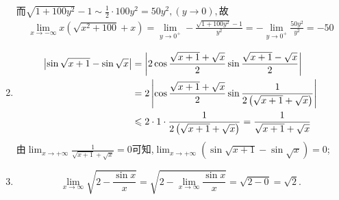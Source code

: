 \begin{solution}
\begin{enumerate}
        而$\sqrt{1+100y^2}-1\sim \frac{1}{2}\cdot 100y^2=50y^2,(y\to 0),$故
        \begin{align*}
            \lim_{x \to -\infty}x(\sqrt{x^2+100}+x) =\lim_{y \to 0^+}-\frac{\sqrt{1+100y^2}-1}{y^2}=-\lim_{y \to 0^+}\frac{50y^2}{y^2}=-50
        \end{align*} 
        \item \begin{align*}
            \left| \sin \sqrt{x+1}-\sin\sqrt{x} \right| &=\left| 2 \cos \frac{\sqrt{x+1}+\sqrt{x}}{2} \sin \frac{\sqrt{x+1}-\sqrt{x}}{2} \right|  \\
            &=2 \left|\cos \frac{\sqrt{x+1}+\sqrt{x}}{2}\sin \frac{1}{2\left(\sqrt{x+1}+\sqrt{x}\right)}\right|\\
            &\leqslant 2\cdot1\cdot  \frac{1}{2\left(\sqrt{x+1}+\sqrt{x}\right)}=\frac{1}{\sqrt{x+1}+\sqrt{x}}
        \end{align*}
         由$\lim_{x \to +\infty} \frac{1}{\sqrt{x+1}+\sqrt{x}} = 0$可知,$\lim_{x \to +\infty} (\sin\sqrt{x+1}-\sin\sqrt{x}) = 0$;
        \item $$\lim_{x \to \infty} \sqrt{2-\frac{\sin x}{x}} = \sqrt{2 - \lim_{x \to \infty} \frac{\sin x}{x}} = \sqrt{2 - 0} = \sqrt{2}.$$
    \end{enumerate}
\end{solution}


